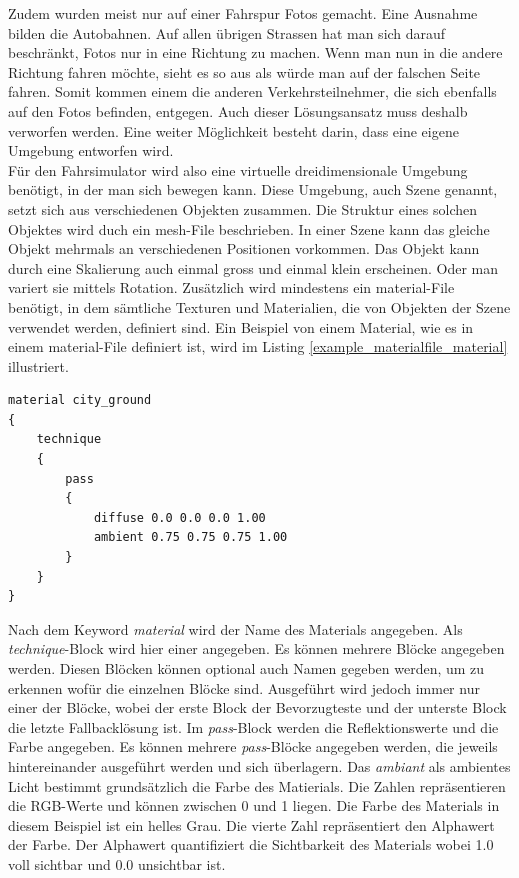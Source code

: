 Zudem wurden meist nur auf einer Fahrspur Fotos gemacht. Eine Ausnahme bilden die Autobahnen. Auf allen übrigen Strassen hat man sich darauf beschränkt, Fotos nur in eine Richtung zu machen. Wenn man nun in die andere Richtung fahren möchte, sieht es so aus als würde man auf der falschen Seite fahren. Somit kommen einem die anderen Verkehrsteilnehmer, die sich ebenfalls auf den Fotos befinden, entgegen. Auch dieser Lösungsansatz muss deshalb verworfen werden. Eine weiter Möglichkeit besteht darin, dass eine eigene Umgebung entworfen wird.\\
Für den Fahrsimulator wird also eine virtuelle dreidimensionale Umgebung benötigt, in der man sich bewegen kann. Diese Umgebung, auch Szene genannt, setzt sich aus verschiedenen Objekten zusammen. Die Struktur eines solchen Objektes wird duch ein mesh-File beschrieben. In einer Szene kann das gleiche Objekt mehrmals an verschiedenen Positionen vorkommen. Das Objekt kann durch eine Skalierung auch einmal gross und einmal klein erscheinen. Oder man variert sie mittels Rotation. Zusätzlich wird mindestens ein material-File benötigt, in dem sämtliche Texturen und Materialien, die von Objekten der Szene verwendet werden, definiert sind.
Ein Beispiel von einem Material, wie es in einem material-File definiert ist, wird im Listing \ref{example_materialfile_material} illustriert.
\begin{lstlisting}[caption={Beispiel aus dem material-File für ein Material},label={example_materialfile_material}]
material city_ground
{
	technique
	{
		pass
		{
			diffuse 0.0 0.0 0.0 1.00
			ambient 0.75 0.75 0.75 1.00	
		}
	}
}
\end{lstlisting}
Nach dem Keyword \textit{material} wird der Name des Materials angegeben. Als \textit{technique}-Block wird hier einer angegeben. Es können mehrere Blöcke angegeben werden. Diesen Blöcken können optional auch Namen gegeben werden, um zu erkennen wofür die einzelnen Blöcke sind. Ausgeführt wird jedoch immer nur einer der Blöcke, wobei der erste Block der Bevorzugteste und der unterste Block die letzte Fallbacklösung ist. Im \textit{pass}-Block werden die Reflektionswerte und die Farbe angegeben. Es können mehrere \textit{pass}-Blöcke angegeben werden, die jeweils hintereinander ausgeführt werden und sich überlagern. Das \textit{ambiant} als ambientes Licht bestimmt grundsätzlich die Farbe des Matierials. Die Zahlen repräsentieren die RGB-Werte und können zwischen 0 und 1 liegen. Die Farbe des Materials in diesem Beispiel ist ein helles Grau. Die vierte Zahl repräsentiert den Alphawert der Farbe. Der Alphawert quantifiziert die Sichtbarkeit des Materials wobei 1.0 voll sichtbar und 0.0 unsichtbar ist.
